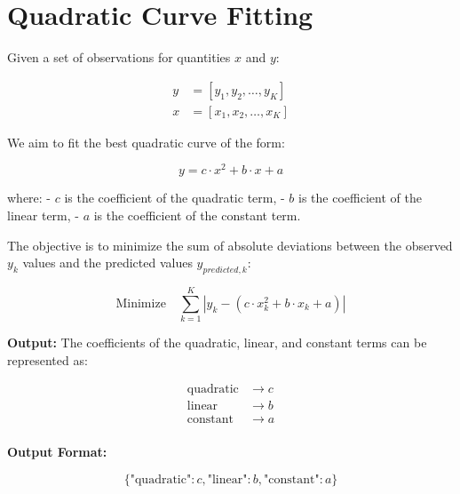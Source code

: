 \documentclass{article}
\begin{document}
\section*{Quadratic Curve Fitting}

Given a set of observations for quantities \(x\) and \(y\):

\[
\begin{align*}
y & = [y_{1}, y_{2}, \ldots, y_{K}] \\
x & = [x_{1}, x_{2}, \ldots, x_{K}]
\end{align*}
\]

We aim to fit the best quadratic curve of the form:

\[
y = c \cdot x^2 + b \cdot x + a
\]

where:
- \(c\) is the coefficient of the quadratic term,
- \(b\) is the coefficient of the linear term,
- \(a\) is the coefficient of the constant term.

The objective is to minimize the sum of absolute deviations between the observed \(y_k\) values and the predicted values \(y_{predicted,k}\):

\[
\text{Minimize} \quad \sum_{k=1}^{K} |y_{k} - (c \cdot x_{k}^2 + b \cdot x_{k} + a)|
\]

\textbf{Output:} The coefficients of the quadratic, linear, and constant terms can be represented as:

\[
\begin{align*}
\text{quadratic} & \rightarrow c \\
\text{linear} & \rightarrow b \\
\text{constant} & \rightarrow a \\
\end{align*}
\]

\textbf{Output Format:}

\[
\{
    \text{"quadratic"}: c,
    \text{"linear"}: b,
    \text{"constant"}: a
\}
\]
\end{document}
